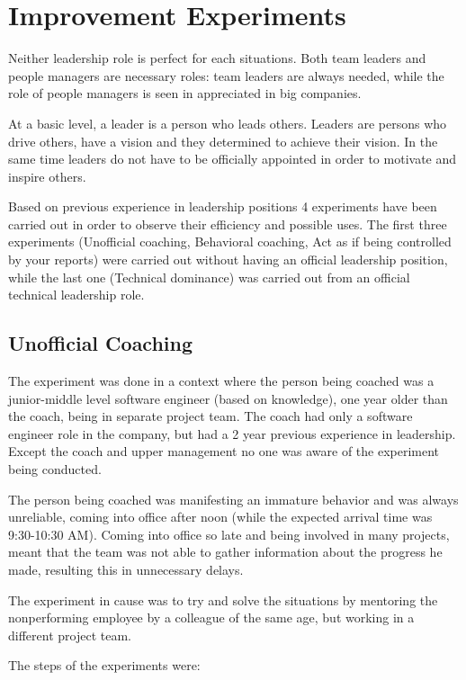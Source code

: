 \chapter{Improvement Experiments}
\label{chapter:improvement}
Neither leadership role is perfect for each situations. Both team leaders and people managers are necessary roles: team leaders are always needed, while the role of people managers is seen in appreciated in big companies.

At a basic level, a leader is a person who leads others. Leaders are persons who drive others, have a vision and they determined to achieve their vision. In the same time leaders do not have to be officially appointed in order to motivate and inspire others.

Based on previous experience in leadership positions 4 experiments have been carried out in order to observe their efficiency and possible uses. The first three experiments (Unofficial coaching, Behavioral coaching, Act as if  being controlled by your reports) were carried out without having an official leadership position, while the last one (Technical dominance) was carried out from an official technical leadership role.

\section{Unofficial Coaching}
\label{sec:un-coach}

The experiment was done in a context where the person being coached was a junior-middle level software engineer (based on knowledge), one year older than the coach, being in separate project team. The coach had only a software engineer role in the company, but had a 2 year previous experience in leadership. Except the coach and upper management no one was aware of the experiment being conducted.

The person being coached was manifesting an immature behavior and was always unreliable, coming into office after noon (while the expected arrival time was 9:30-10:30 AM). Coming into office so late and being involved in many projects, meant that the team was not able to gather information about the progress he made, resulting this in unnecessary delays. 

The experiment in cause was to try and solve the situations by mentoring the nonperforming employee by a colleague of the same age, but working in a different project team.

The steps of the experiments were:

